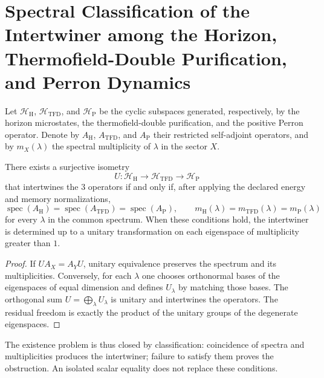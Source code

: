 
\section{Spectral Classification of the Intertwiner among the Horizon, Thermofield-Double Purification, and Perron Dynamics}
\label{sec:ivv-horizon-tfd-perron-classification}

Let \(\mathcal H_{\mathrm H}\), \(\mathcal H_{\mathrm{TFD}}\), and \(\mathcal H_{\mathrm P}\) be the cyclic subspaces generated, respectively, by the horizon microstates, the thermofield-double purification, and the positive Perron operator. Denote by \(A_{\mathrm H}\), \(A_{\mathrm{TFD}}\), and \(A_{\mathrm P}\) their restricted self-adjoint operators, and by \(m_X(\lambda)\) the spectral multiplicity of \(\lambda\) in the sector \(X\).

\begin{theorem}
\label{thm:ivv-horizon-tfd-perron-classification}
There exists a surjective isometry
\[
 U:\mathcal H_{\mathrm H}\longrightarrow\mathcal H_{\mathrm{TFD}}
 \longrightarrow\mathcal H_{\mathrm P}
\]
that intertwines the \(3\) operators if and only if, after applying the
declared energy and memory normalizations,
\[
 \operatorname{spec}(A_{\mathrm H})
 =\operatorname{spec}(A_{\mathrm{TFD}})
 =\operatorname{spec}(A_{\mathrm P}),
 \qquad
 m_{\mathrm H}(\lambda)=m_{\mathrm{TFD}}(\lambda)=m_{\mathrm P}(\lambda)
\]
for every \(\lambda\) in the common spectrum. When these conditions
hold, the intertwiner is determined up to a unitary transformation
on each eigenspace of multiplicity greater than \(1\).
\end{theorem}

\begin{proof}
If \(U A_X=A_YU\), unitary equivalence preserves the spectrum and its
multiplicities. Conversely, for each \(\lambda\) one chooses orthonormal bases
of the eigenspaces of equal dimension and defines
\(U_\lambda\) by matching those bases. The orthogonal sum
\(U=\bigoplus_\lambda U_\lambda\) is unitary and intertwines the operators.
The residual freedom is exactly the product of the unitary groups of the
degenerate eigenspaces.
\end{proof}

The existence problem is thus closed by classification: coincidence
of spectra and multiplicities produces the intertwiner; failure to satisfy them
proves the obstruction. An isolated scalar equality does not replace these
conditions.

